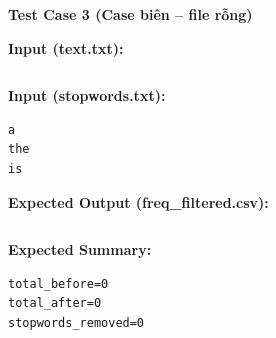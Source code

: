 \textbf{Test Case 3 (Case biên -- file rỗng)}

\textbf{Input (text.txt):}

\begin{lstlisting}

\end{lstlisting}

\textbf{Input (stopwords.txt):}

\begin{lstlisting}
a
the
is
\end{lstlisting}

\textbf{Expected Output (freq\_filtered.csv):}

\begin{lstlisting}

\end{lstlisting}

\textbf{Expected Summary:}

\begin{lstlisting}
total_before=0
total_after=0
stopwords_removed=0
\end{lstlisting}